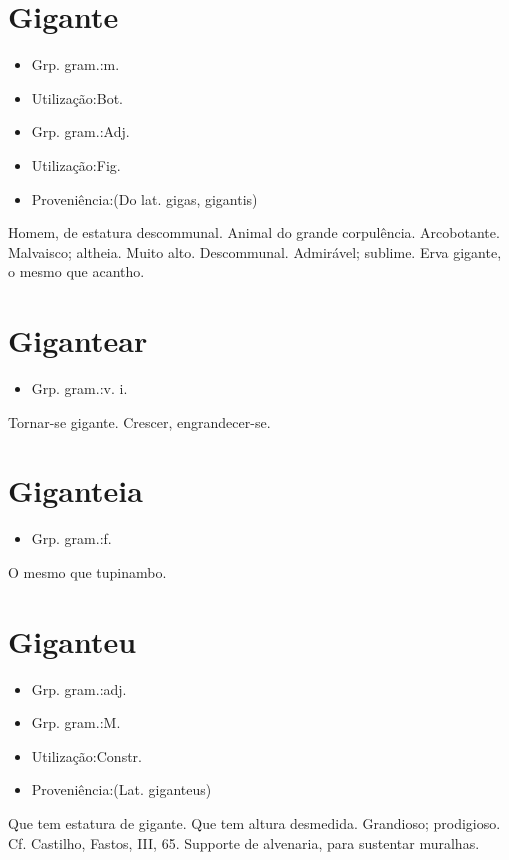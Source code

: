 \section{Gigante}
\begin{itemize}
\item {Grp. gram.:m.}
\end{itemize}
\begin{itemize}
\item {Utilização:Bot.}
\end{itemize}
\begin{itemize}
\item {Grp. gram.:Adj.}
\end{itemize}
\begin{itemize}
\item {Utilização:Fig.}
\end{itemize}
\begin{itemize}
\item {Proveniência:(Do lat. \textunderscore gigas\textunderscore , \textunderscore gigantis\textunderscore )}
\end{itemize}
Homem, de estatura descommunal.
Animal do grande corpulência.
Arcobotante.
Malvaisco; altheia.
Muito alto.
Descommunal.
Admirável; sublime.
\textunderscore Erva gigante\textunderscore , o mesmo que \textunderscore acantho\textunderscore .
\section{Gigantear}
\begin{itemize}
\item {Grp. gram.:v. i.}
\end{itemize}
Tornar-se gigante.
Crescer, engrandecer-se.
\section{Giganteia}
\begin{itemize}
\item {Grp. gram.:f.}
\end{itemize}
O mesmo que \textunderscore tupinambo\textunderscore .
\section{Giganteu}
\begin{itemize}
\item {Grp. gram.:adj.}
\end{itemize}
\begin{itemize}
\item {Grp. gram.:M.}
\end{itemize}
\begin{itemize}
\item {Utilização:Constr.}
\end{itemize}
\begin{itemize}
\item {Proveniência:(Lat. \textunderscore giganteus\textunderscore )}
\end{itemize}
Que tem estatura de gigante.
Que tem altura desmedida.
Grandioso; prodigioso. Cf. Castilho, \textunderscore Fastos\textunderscore , III, 65.
Supporte de alvenaria, para sustentar muralhas.
